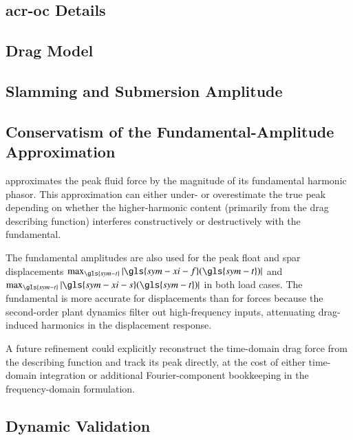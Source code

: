 \subsection{\gls{acr-oc} Details}


\subsection{Drag Model
\label{sec:appendix-drag}}


\subsection{Slamming and Submersion Amplitude}
\label{sec:appendix-slam}


\subsection{Conservatism of the Fundamental-Amplitude Approximation}
\label{sec:appendix-peak-fluid-force}

 approximates the peak fluid force by the magnitude of its fundamental harmonic phasor.
This approximation can either under- or overestimate the true peak depending on whether the higher-harmonic content (primarily from the drag describing function) interferes constructively or destructively with the fundamental.

The fundamental amplitudes are also used for the peak float and spar displacements $\max_{\gls{sym-t}}|\gls{sym-xi-f}(\gls{sym-t})|$ and $\max_{\gls{sym-t}}|\gls{sym-xi-s}(\gls{sym-t})|$ in both load cases.
The fundamental is more accurate for displacements than for forces because the second-order plant dynamics filter out high-frequency inputs, attenuating drag-induced harmonics in the displacement response.

A future refinement could explicitly reconstruct the time-domain drag force from the describing function and track its peak directly, at the cost of either time-domain integration or additional Fourier-component bookkeeping in the frequency-domain formulation.


\subsection{Dynamic Validation}
\label{sec:appendix-dynamic-validation}

